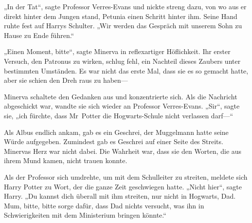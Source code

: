 „In der Tat“, sagte Professor Verres-Evans und nickte streng dazu, von wo aus er direkt hinter dem Jungen stand, Petunia einen Schritt hinter ihm. Seine Hand ruhte fest auf Harrys Schulter. „Wir werden das Gespräch mit unserem Sohn zu Hause zu Ende führen.“

„Einen Moment, bitte“, sagte Minerva in reflexartiger Höflichkeit.
Ihr erster Versuch, den Patronus zu wirken, schlug fehl, ein Nachteil dieses Zaubers unter bestimmten Umständen. Es war nicht das erste Mal, dass sie es so gemacht hatte, aber sie schien den Dreh raus zu haben—


Minerva schaltete den Gedanken aus und konzentrierte sich. Als die Nachricht abgeschickt war, wandte sie sich wieder an Professor Verres-Evans.
„Sir“, sagte sie, „ich fürchte, dass Mr~Potter die Hogwarts-Schule nicht verlassen darf—“

Als Albus endlich ankam, gab es ein Geschrei, der Muggelmann hatte seine Würde aufgegeben. Zumindest gab es Geschrei auf einer Seite des Streits. Minervas Herz war nicht dabei. Die Wahrheit war, dass sie den Worten, die aus ihrem Mund kamen, nicht trauen konnte.

Als der Professor sich umdrehte, um mit dem Schulleiter zu streiten, meldete sich Harry Potter zu Wort, der die ganze Zeit geschwiegen hatte. „Nicht hier“, sagte Harry. „Du kannst dich überall mit ihm streiten, nur nicht in Hogwarts, Dad. Mum, bitte, bitte sorge dafür, dass Dad nichts versucht, was ihn in Schwierigkeiten mit dem Ministerium bringen könnte.“

